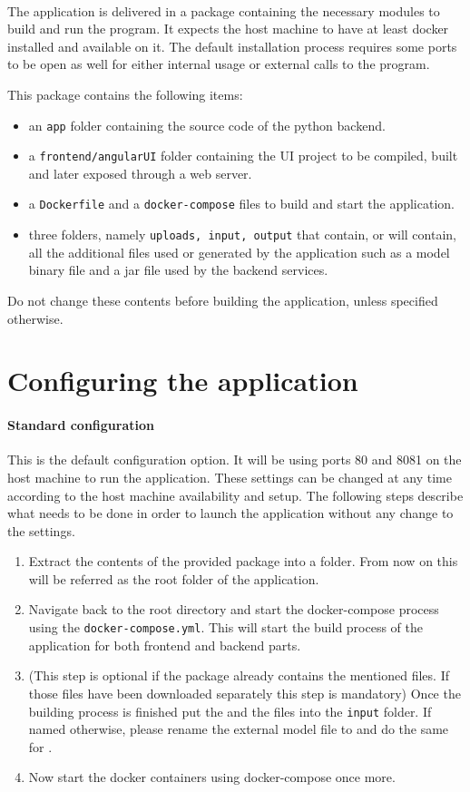 \documentclass{scrreprt}
\begin{document}
\paragraph{}The application is delivered in a package containing the necessary modules to build and run the program. It expects the host machine to have at least docker installed and available on it. The default installation process requires some ports to be open as well for either internal usage or external calls to the program.

This package contains the following items:
\begin{itemize}
	\item an \texttt{app} folder containing the source code of the python backend.
	\item a \texttt{frontend/angularUI} folder containing the UI project to be compiled, built and later exposed through a web server.
	\item a \texttt{Dockerfile} and a \texttt{docker-compose} files to build and start the application.
	\item three folders, namely \texttt{uploads, input, output} that contain, or will contain, all the additional files used or generated by the application such as a model binary file and a jar file used by the backend services.
\end{itemize}
Do not change these contents before building the application, unless specified otherwise.

\section{Configuring the application}
\paragraph{Standard configuration} This is the default configuration option. It will be using ports 80 and 8081 on the host machine to run the application. These settings can be changed at any time according to the host machine availability and setup. The following steps describe what needs to be done in order to launch the application without any change to the settings.
\begin{enumerate}
	\item Extract the contents of the provided package into a folder. From now on this will be referred as the root folder of the application.
	\item Navigate back to the root directory and start the docker-compose process using the \texttt{docker-compose.yml}. This will start the build process of the application for both frontend and backend parts.	
	\item (This step is optional if the package already contains the mentioned files. If those files have been downloaded separately this step is mandatory) Once the building process is finished put the \jaxb \space and the \model \space files into the \texttt{input} folder. If named otherwise, please rename the external model file to \model \space and do the same for \jaxb.
	\item Now start the docker containers using docker-compose once more.
\end{enumerate}
\end{document}
